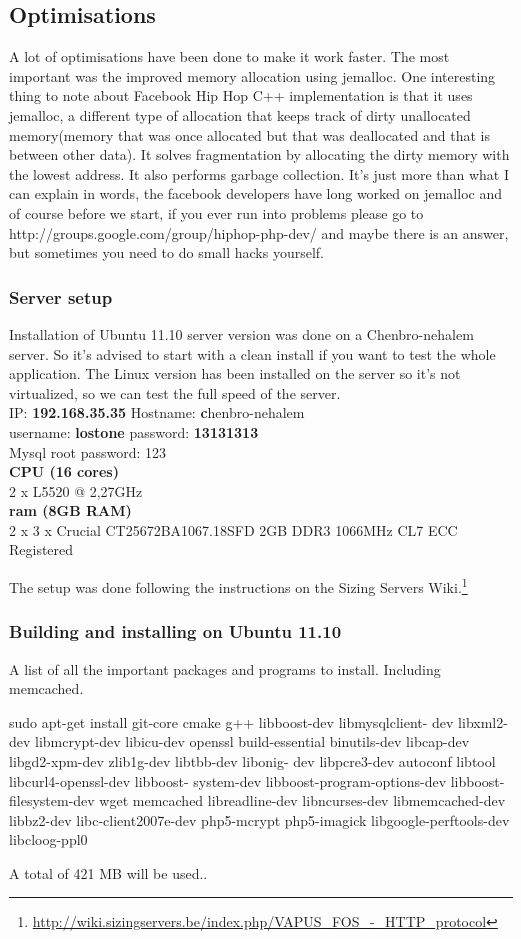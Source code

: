 \subsection{Optimisations}
A lot of optimisations\cite{hiphop_efficient_servers} have been done to make it work faster. The most important was the improved memory allocation using jemalloc\cite{hiphop_jemalloc}.
One interesting thing to note about Facebook Hip Hop C++ implementation is that it uses jemalloc, a different type of allocation that keeps track of dirty unallocated memory(memory that was once allocated but that was deallocated and that is between other data). 
It solves fragmentation by allocating the dirty memory with the lowest address. It also performs garbage collection.
It's just more than what I can explain in words, the facebook developers have long worked on  jemalloc and of course before we start, if you ever run into problems please go to http://groups.google.com/group/hiphop-php-dev/ and maybe there is an answer, but sometimes you need to do small hacks yourself.
\subsubsection{Server setup}
Installation of Ubuntu 11.10 server version was done on a Chenbro-nehalem server. So it's advised to start with a clean install if you want to test the whole application. The Linux version has been installed on the server so it's not virtualized, so we can test the full speed of the server.
\\IP: \textbf{192.168.35.35} Hostname: {\textbf chenbro-nehalem}
\\username: \textbf{lostone} password: \textbf{13131313}
\\Mysql root password: 123
\\\textbf{CPU (16 cores)}		
\\2 x L5520 @ 2,27GHz
\\\textbf{\gls{ram} (8GB RAM)}
\\2 x 3 x Crucial CT25672BA1067.18SFD 2GB DDR3 1066MHz CL7 ECC Registered

The setup was done following the instructions on the Sizing Servers Wiki.\footnote{\url{http://wiki.sizingservers.be/index.php/VAPUS_FOS_-_HTTP_protocol}}

\subsubsection{Building and installing on Ubuntu 11.10}
A list of all the important packages and programs to install. Including \gls{memcached}.
\begin{codelisting}
sudo apt-get install git-core cmake g++ libboost-dev libmysqlclient-
	dev libxml2-dev libmcrypt-dev libicu-dev openssl build-essential
	binutils-dev libcap-dev libgd2-xpm-dev zlib1g-dev libtbb-dev libonig-
	dev libpcre3-dev autoconf libtool libcurl4-openssl-dev libboost-
	system-dev libboost-program-options-dev libboost-filesystem-dev wget
	memcached libreadline-dev libncurses-dev libmemcached-dev libbz2-dev
	libc-client2007e-dev php5-mcrypt php5-imagick libgoogle-perftools-dev
	libcloog-ppl0
\end{codelisting}
A total of 421 MB will be used..


